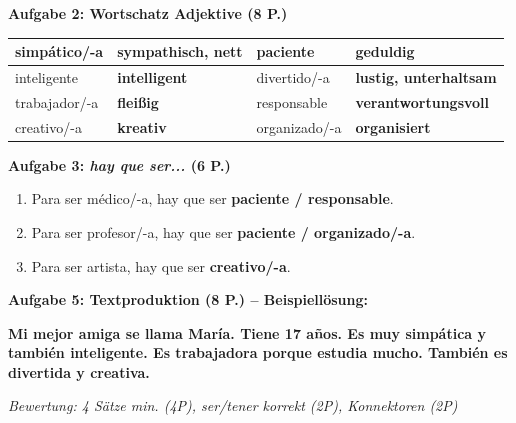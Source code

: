 \documentclass[11pt,a4paper]{article}
\newcommand{\lsg}[1]{\textcolor{loesung}{\textbf{#1}}}
\newcommand{\es}[1]{\textit{#1}}
\begin{document}
\begin{gruppenbox}
\vspace{0.5em}

\textbf{Aufgabe 2: Wortschatz Adjektive (8 P.)}

\begin{tabularx}{\textwidth}{@{}|X|X|X|X|@{}}
\hline
simpático/-a & \lsg{sympathisch, nett} & paciente & \lsg{geduldig} \\
\hline
inteligente & \lsg{intelligent} & divertido/-a & \lsg{lustig, unterhaltsam} \\
\hline
trabajador/-a & \lsg{fleißig} & responsable & \lsg{verantwortungsvoll} \\
\hline
creativo/-a & \lsg{kreativ} & organizado/-a & \lsg{organisiert} \\
\hline
\end{tabularx}

\vspace{0.5em}

\textbf{Aufgabe 3: \es{hay que ser...} (6 P.)}
\begin{enumerate}[label=\alph*), leftmargin=2em, nosep]
    \item Para ser médico/-a, hay que ser \lsg{paciente / responsable}.
    \item Para ser profesor/-a, hay que ser \lsg{paciente / organizado/-a}.
    \item Para ser artista, hay que ser \lsg{creativo/-a}.
\end{enumerate}

\vspace{0.5em}

\textbf{Aufgabe 5: Textproduktion (8 P.) -- Beispiellösung:}

\lsg{Mi mejor amiga se llama María. Tiene 17 años. Es muy simpática y también inteligente. Es trabajadora porque estudia mucho. También es divertida y creativa.}

\vspace{0.3em}
\textit{\textcolor{grau}{Bewertung: 4 Sätze min. (4P), ser/tener korrekt (2P), Konnektoren (2P)}}

\end{gruppenbox}

\vspace{1em}
\end{document}

